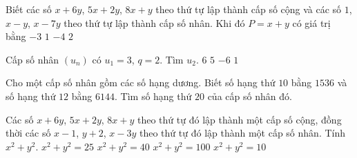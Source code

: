 \begin{ex}%
    Biết các số $x+6y$, $5x+2y$, $8x+y$ theo thứ tự lập thành cấp số cộng và các số $1$, $x-y$, $x-7y$ theo thứ tự lập thành cấp số nhân. Khi đó $P=x+y$ có giá trị bằng
    \choice
    {$-3$}
    {$1$}
    {\True $-4$}
    {$2$}
\end{ex}

\begin{ex}
    Cấp số nhân $\left(u_n\right)$ có $u_1=3$, $q=2$. Tìm $u_2$.
    \choice
    {\True $6$}
    {$5$}
    {$-6$}
    {$1$}
\end{ex}

\begin{ex}[KNTT]%
    Cho một cấp số nhân gồm các số hạng dương. Biết số hạng thứ $10$ bằng $1536$ và số hạng thứ $12$ bằng $6144$. Tìm số hạng thứ $20$ của cấp số nhân đó.
\end{ex}

\begin{ex}
    Các số $x+6y$, $5x+2y$, $8x+y$ theo thứ tự đó lập thành một cấp số cộng, đồng thời các số $x-1$, $y+2$, $x-3y$ theo thứ tự đó lập thành một cấp số nhân. Tính $x^2+y^2$.
    \choice
    {$x^2+y^2=25$}
    {\True $x^2+y^2=40$}
    {$x^2+y^2=100$}
    {$x^2+y^2=10$}
\end{ex}

